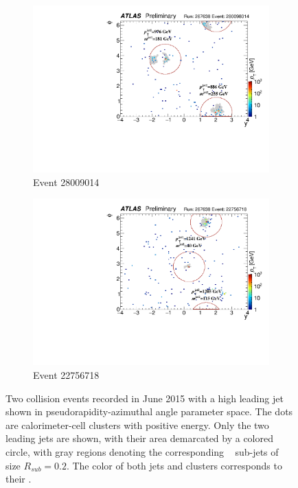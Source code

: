 \begin{figure}[htbp!]
  \centering
  \captionsetup{justification=centering}
  \hspace{-3cm}
    \begin{subfigure}[b]{0.35\textwidth}
        \includegraphics[width=\textwidth,angle=-90]{figures/object/Jet_evt_a.pdf}
        \caption{Event 28009014}
        \label{fig:obj_jet_evt_a}
    \end{subfigure}
    \quad \quad \quad \quad
    \begin{subfigure}[b]{0.35\textwidth}
        \includegraphics[width=\textwidth,angle=-90]{figures/object/Jet_evt_b.pdf}
        \caption{Event 22756718}
        \label{fig:obj_jet_evt_b}
    \end{subfigure}
   \caption{
   Two collision events recorded in June 2015 with a high leading jet \pt~ shown in pseudorapidity-azimuthal angle parameter space.
   The dots are calorimeter-cell clusters with positive energy. 
   Only the two leading jets are shown, with their area demarcated by a colored circle, with gray regions denoting the corresponding \kt~ sub-jets of size $R_{sub}=0.2$. 
   The color of both jets and clusters corresponds to their \pt.}
  \label{fig:obj_jet_evt}
\end{figure}

